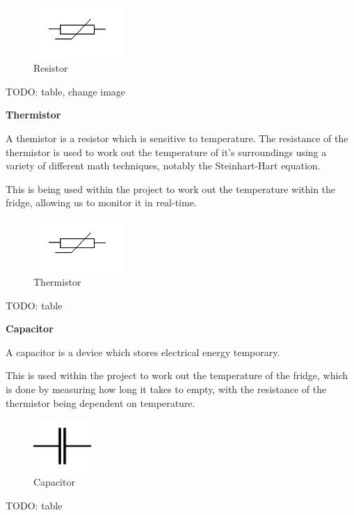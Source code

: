 \documentclass[10pt]{article}
\begin{document}
\begin{figure}[h]
\centering
\caption{Resistor}
\label{Resistorr}
\includegraphics[height=2cm]{images/resistor_diagram.jpg}
\end{figure}

TODO: table, change image

\textbf{Thermistor}

A themistor is a resistor which is sensitive to temperature. The resistance of the thermistor is used to work out the temperature of it's surroundings using a variety of different math techniques, notably the Steinhart-Hart equation.

This is being used within the project to work out the temperature within the fridge, allowing us to monitor it in real-time.

\begin{figure}[h]
\centering
\caption{Thermistor}
\label{Thermistor}
\includegraphics[height=2cm]{images/thermistor_diagram.jpg}
\end{figure}

TODO: table

\textbf{Capacitor}

A capacitor is a device which stores electrical energy temporary.

This is used within the project to work out the temperature of the fridge, which is done by measuring how long it takes to empty, with the resistance of the thermistor being dependent on temperature.

\begin{figure}[h]
\centering
\caption{Capacitor}
\label{Capacitor}
\includegraphics[height=2cm]{images/capacitor_diagram.jpg}
\end{figure}

TODO: table
\end{document}
